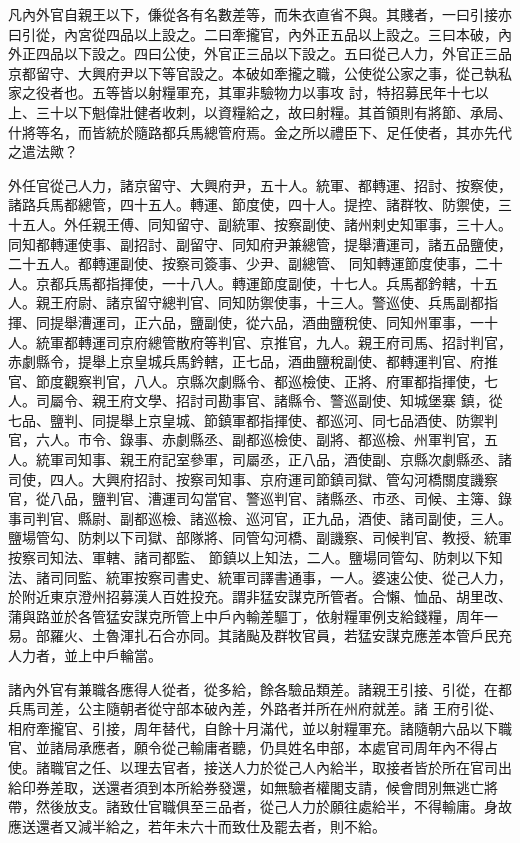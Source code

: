 \begin{pinyinscope}
 凡內外官自親王以下，傔從各有名數差等，而朱衣直省不與。其賤者，一曰引接亦曰引從，內宮從四品以上設之。二曰牽攏官，內外正五品以上設之。三曰本破，內外正四品以下設之。四曰公使，外官正三品以下設之。五曰從己人力，外官正三品京都留守、大興府尹以下等官設之。本破如牽攏之職，公使從公家之事，從己執私家之役者也。五等皆以射糧軍充，其軍非驗物力以事攻
 討，特招募民年十七以上、三十以下魁偉壯健者收刺，以資糧給之，故曰射糧。其首領則有將節、承局、什將等名，而皆統於隨路都兵馬總管府焉。金之所以禮臣下、足任使者，其亦先代之遣法歟？



 外任官從己人力，諸京留守、大興府尹，五十人。統軍、都轉運、招討、按察使，諸路兵馬都總管，四十五人。轉運、節度使，四十人。提控、諸群牧、防禦使，三十五人。外任親王傅、同知留守、副統軍、按察副使、諸州剌史知軍事，三十人。同知都轉運使事、副招討、副留守、同知府尹兼總管，提舉漕運司，諸五品鹽使，二十五人。都轉運副使、按察司簽事、少尹、副總管、
 同知轉運節度使事，二十人。京都兵馬都指揮使，一十八人。轉運節度副使，十七人。兵馬都鈐轄，十五人。親王府尉、諸京留守總判官、同知防禦使事，十三人。警巡使、兵馬副都指揮、同提舉漕運司，正六品，鹽副使，從六品，酒曲鹽稅使、同知州軍事，一十人。統軍都轉運司京府總管散府等判官、京推官，九人。親王府司馬、招討判官，赤劇縣令，提舉上京皇城兵馬鈐轄，正七品，酒曲鹽稅副使、都轉運判官、府推官、節度觀察判官，八人。京縣次劇縣令、都巡檢使、正將、府軍都指揮使，七人。司屬令、親王府文學、招討司勘事官、諸縣令、警巡副使、知城堡寨
 鎮，從七品、鹽判、同提舉上京皇城、節鎮軍都指揮使、都巡河、同七品酒使、防禦判官，六人。市令、錄事、赤劇縣丞、副都巡檢使、副將、都巡檢、州軍判官，五人。統軍司知事、親王府記室參軍，司屬丞，正八品，酒使副、京縣次劇縣丞、諸司使，四人。大興府招討、按察司知事、京府運司節鎮司獄、管勾河橋關度譏察官，從八品，鹽判官、漕運司勾當官、警巡判官、諸縣丞、市丞、司候、主簿、錄事司判官、縣尉、副都巡檢、諸巡檢、巡河官，正九品，酒使、諸司副使，三人。鹽場管勾、防刺以下司獄、部隊將、同管勾河橋、副譏察、司候判官、教授、統軍按察司知法、軍轄、諸司都監、
 節鎮以上知法，二人。鹽場同管勾、防刺以下知法、諸司同監、統軍按察司書史、統軍司譯書通事，一人。婆速公使、從己人力，於附近東京澄州招募漢人百姓投充。謂非猛安謀克所管者。合懶、恤品、胡里改、蒲與路並於各管猛安謀克所管上中戶內輸差驅丁，依射糧軍例支給錢糧，周年一易。部羅火、土魯渾扎石合亦同。其諸颭及群牧官員，若猛安謀克應差本管戶民充人力者，並上中戶輪當。



 諸內外官有兼職各應得人從者，從多給，餘各驗品類差。諸親王引接、引從，在都兵馬司差，公主隨朝者從守部本破內差，外路者并所在州府就差。諸
 王府引從、相府牽攏官、引接，周年替代，自餘十月滿代，並以射糧軍充。諸隨朝六品以下職官、並諸局承應者，願令從己輸庸者聽，仍具姓名申部，本處官司周年內不得占使。諸職官之任、以理去官者，接送人力於從己人內給半，取接者皆於所在官司出給印券差取，送還者須到本所給券發還，如無驗者權閣支請，候會問別無逃亡將帶，然後放支。諸致仕官職俱至三品者，從己人力於願往處給半，不得輸庸。身故應送還者又減半給之，若年未六十而致仕及罷去者，則不給。



\end{pinyinscope}